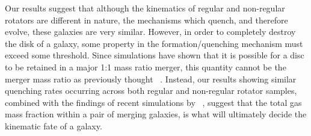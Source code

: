 \documentclass[useAMS,usenatbib]{mn2e}
\begin{document}
Our results suggest that although the kinematics of regular and non-regular rotators are different in nature, the mechanisms which quench, and therefore evolve, these galaxies are very similar. However, in order to completely destroy the disk of a galaxy, some property in the formation/quenching mechanism must exceed some threshold. Since simulations have shown that it is possible for a disc to be retained in a major 1:1 mass ratio merger, this quantity cannot be the merger mass ratio as previously thought ~\citep{binneytremaine, bois10, tonini16}. Instead, our results showing similar quenching rates occurring across both regular and non-regular rotator samples, combined with the findings of recent simulations by ~\cite{pontzen16, sparre16}, suggest that the total gas mass fraction within a pair of merging galaxies, is what will ultimately decide the kinematic fate of a galaxy. 


  




\end{document}
